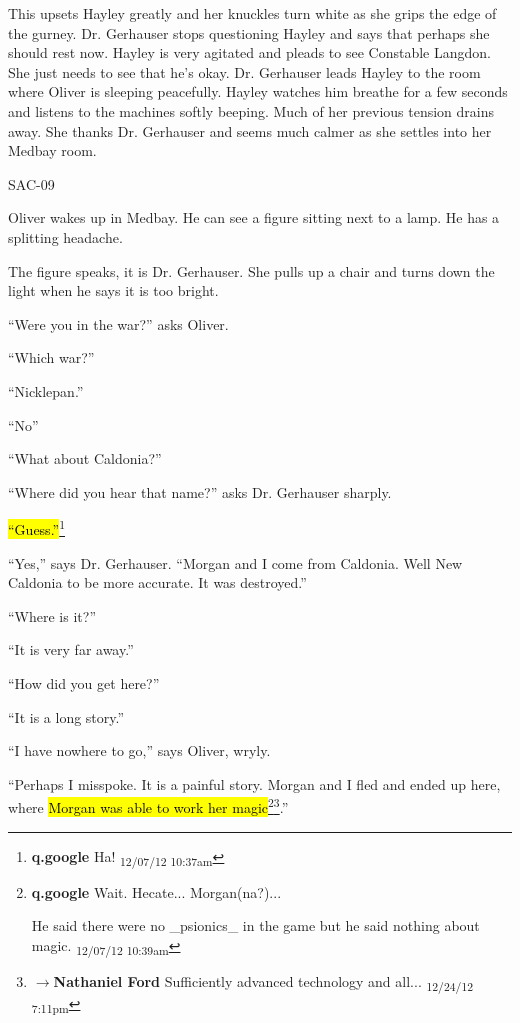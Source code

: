This upsets Hayley greatly and her knuckles turn white as she grips the edge of the gurney.  Dr. Gerhauser stops questioning Hayley and says that perhaps she should rest now.  Hayley is very agitated and pleads to see Constable Langdon.  She just needs to see that he's okay.  Dr. Gerhauser leads Hayley to the room where Oliver is sleeping peacefully.  Hayley watches him breathe for a few seconds and listens to the machines softly beeping.  Much of her previous tension drains away.  She thanks Dr. Gerhauser and seems much calmer as she settles into her Medbay room. 



 {\LARGE SAC-09 } 



Oliver wakes up in Medbay.  He can see a figure sitting next to a lamp.  He has a splitting headache.



The figure speaks, it is Dr. Gerhauser.  She pulls up a chair and turns down the light when he says it is too bright.  



``Were you in the war?'' asks Oliver.

``Which war?''

``Nicklepan.''

``No''

``What about Caldonia?''

``Where did you hear that name?'' asks Dr. Gerhauser sharply.

\hl{``Guess.''}\footnote{\textbf{q.google }Ha! \textsubscript{12/07/12 10:37am}}

``Yes,'' says Dr. Gerhauser.  ``Morgan and I come from Caldonia.  Well New Caldonia to be more accurate.  It was destroyed.''

``Where is it?''

``It is very far away.''

``How did you get here?''

``It is a long story.''

``I have nowhere to go,'' says Oliver, wryly.

``Perhaps I misspoke.  It is a painful story.  Morgan and I fled and ended up here, where \hl{Morgan was able to work her magic}\footnote{\textbf{q.google }Wait.  Hecate... Morgan(na?)... 

He said there were no \_psionics\_ in the game but he said nothing about magic. \textsubscript{12/07/12 10:39am}}\footnote{$\rightarrow$\textbf{Nathaniel Ford }Sufficiently advanced technology and all... \textsubscript{12/24/12 7:11pm}}.''

